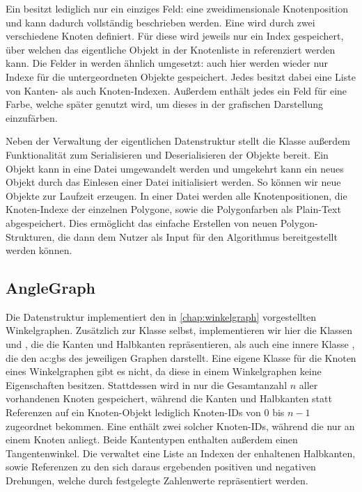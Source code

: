 Ein  besitzt lediglich nur ein einziges Feld: eine zweidimensionale Knotenposition und kann dadurch vollständig
beschrieben werden. Eine  wird durch zwei verschiedene Knoten definiert. Für diese wird jeweils nur ein Index gespeichert,
über welchen das eigentliche  Objekt in der Knotenliste in  referenziert werden kann. Die Felder in
 werden ähnlich umgesetzt: auch hier werden wieder nur Indexe für die untergeordneten Objekte gespeichert. Jedes
 besitzt dabei eine Liste von Kanten- als auch Knoten-Indexen. Außerdem enthält jedes  ein Feld
für eine Farbe, welche später genutzt wird, um dieses in der grafischen Darstellung einzufärben.

Neben der Verwaltung der eigentlichen Datenstruktur stellt die  Klasse außerdem Funktionalität zum Serialisieren
und Deserialisieren der Objekte bereit. Ein  Objekt kann in eine  Datei umgewandelt werden und umgekehrt
kann ein neues  Objekt durch das Einlesen einer  Datei initialisiert werden. So können wir neue
 Objekte zur Laufzeit erzeugen. In einer  Datei werden alle Knotenpositionen, die Knoten-Indexe der einzelnen
Polygone, sowie die Polygonfarben als Plain-Text abgespeichert. Dies ermöglicht das einfache Erstellen von neuen Polygon-Strukturen, die
dann dem Nutzer als Input für den Algorithmus bereitgestellt werden können.

\subsection{AngleGraph}
Die  Datenstruktur implementiert den in \autoref{chap:winkelgraph} vorgestellten Winkelgraphen. Zusätzlich zur
 Klasse selbst, implementieren wir hier die Klassen  und , die die Kanten
und Halbkanten repräsentieren, als auch eine innere Klasse , die den \gls{ac:gbs} des jeweiligen Graphen
darstellt. Eine eigene Klasse für die Knoten eines Winkelgraphen gibt es nicht, da diese in einem Winkelgraphen keine Eigenschaften
besitzen. Stattdessen wird in  nur die Gesamtanzahl \(n\) aller vorhandenen Knoten gespeichert, während die Kanten
und Halbkanten statt Referenzen auf ein Knoten-Objekt lediglich Knoten-IDs von \(0\) bis \(n - 1\) zugeordnet bekommen.
Eine  enthält zwei solcher Knoten-IDs, während die  nur an einem Knoten anliegt. Beide Kantentypen
enthalten außerdem einen Tangentenwinkel. Die  verwaltet eine Liste an Indexen der enhaltenen Halbkanten, sowie
Referenzen zu den sich daraus ergebenden positiven und negativen Drehungen, welche durch festgelegte Zahlenwerte repräsentiert werden.

